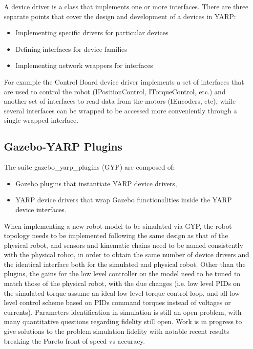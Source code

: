 A device driver is a class that implements one or more interfaces. There are three separate points that cover the design and development of a  devices in YARP:
\begin{itemize}
\item Implementing specific drivers for particular devices
\item Defining interfaces for device families
\item Implementing network wrappers for interfaces
\end{itemize}
For example the Control Board device driver implements a set of interfaces that are used to control the robot (IPositionControl, ITorqueControl, etc.) and another set of interfaces to read data from the motors (IEncoders, etc), while several interfaces can be wrapped to be accessed more conveniently through a single wrapped interface.

\subsection{Gazebo-YARP Plugins}
The suite gazebo\_yarp\_plugins (GYP) are composed of:
\begin{itemize}
    \item Gazebo plugins that instantiate YARP device drivers,
    \item YARP device drivers that wrap Gazebo functionalities inside the YARP device interfaces.
\end{itemize}
When implementing a new robot model to be simulated via GYP, the robot topology needs to be implemented following the same design as that of the physical robot, and sensors and kinematic chains need to be named consistently with the physical robot, in order to obtain the same number of device drivers and the identical interface both for the simulated and physical robot. Other than the plugins, the gains for the low level controller on the model need to be tuned to match those of the physical robot, with the due changes (i.e. low level PIDs on the simulated torque assume an ideal low-level torque control loop, and all low level control scheme based on PIDs command torques instead of voltages or currents).
Parameters identification in simulation is still an open problem, with many quantitative questions regarding fidelity still open. Work is in progress to give solutions to the problem simulation fidelity with notable recent results  \cite{uchida15} breaking the Pareto front of speed vs accuracy.

